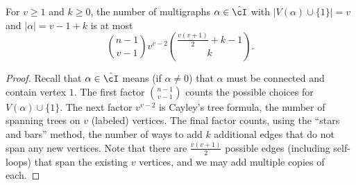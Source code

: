 \documentclass[11pt]{article}
\begin{document}
\begin{lemma}
For $v \ge 1$ and $k \ge 0$, the number of multigraphs $\alpha \in \hat\cI$ with $|V(\alpha) \cup \{1\}| = v$ and $|\alpha| = v-1+k$ is at most
\[ \binom{n-1}{v-1} v^{v-2} \binom{\frac{v(v+1)}{2} + k - 1}{k}. \]
\end{lemma}

\begin{proof}
Recall that $\alpha \in \hat\cI$ means (if $\alpha \ne 0$) that $\alpha$ must be connected and contain vertex $1$. The first factor $\binom{n-1}{v-1}$ counts the possible choices for $V(\alpha) \cup \{1\}$. The next factor $v^{v-2}$ is Cayley's tree formula, the number of spanning trees on $v$ (labeled) vertices. The final factor counts, using the ``stars and bars'' method, the number of ways to add $k$ additional edges that do not span any new vertices. Note that there are $\frac{v(v+1)}{2}$ possible edges (including self-loops) that span the existing $v$ vertices, and we may add multiple copies of each.
\end{proof}
\end{document}
